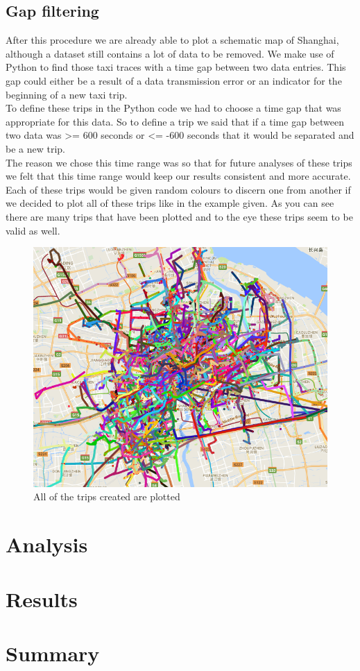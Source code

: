 \documentclass[11pt,conference,a4paper,onecolumn,romanappendices]{IEEEtran}
\begin{document}
\subsection{Gap filtering}
After this procedure we are already able to plot a schematic map of Shanghai, although a dataset still contains a lot of data to be removed. We make use of Python to find those taxi traces with a time gap between two data entries. This gap could either be a result of a data transmission error or an indicator for the beginning of a new taxi trip.\\
To define these trips in the Python code we had to choose a time gap that was appropriate for this data. So to define a trip we said that if a time gap between two data was >= 600 seconds or <= -600 seconds that it would be separated and be a new trip.\\
The reason we chose this time range was so that for future analyses of these trips we felt that this time range would keep our results consistent and more accurate. Each of these trips would be given random colours to discern one from another if we decided to plot all of these trips like in the example given. As you can see there are many trips that have been plotted and to the eye these trips seem to be valid as well.
\\
\begin{figure}
\includegraphics[scale=0.67]{plotalltrips.png}
\caption{\label{fig:plotalltrips}All of the trips created are plotted}
\end{figure}
\section{Analysis}
\section{Results}
\section{Summary}

\newpage


\end{document}
